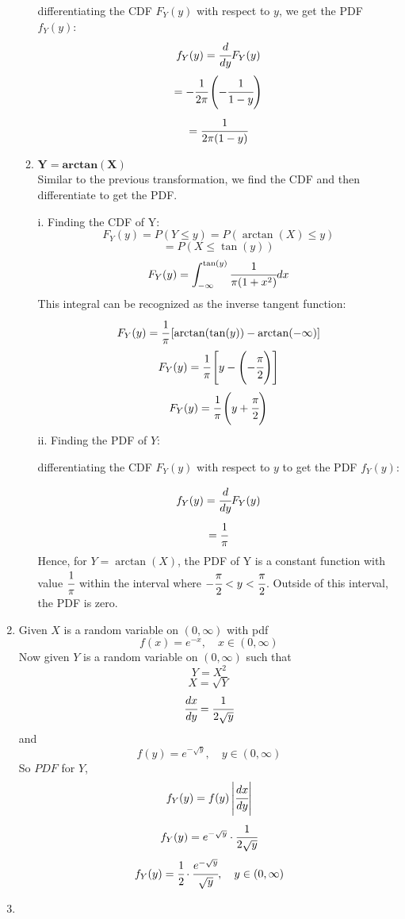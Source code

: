 \documentclass{article}
\begin{document}
\begin{enumerate}
\begin{enumerate}
        differentiating the CDF $F_Y(y)$ with respect to $y$, we get the PDF $f_Y(y)$:
        \[
            f_Y(y) = \cfrac{d}{dy} F_Y(y)
        \]
        \[
            = -\cfrac{1}{2\pi} \left( -\cfrac{1}{1 - y} \right)
        \]
        \[
            = \cfrac{1}{2\pi(1 - y)}
        \]
        \item \( \mathbf{Y = arctan(X)} \)\\
        Similar to the previous transformation, we find the CDF and then differentiate to get the PDF.

        i. Finding the CDF of Y:
        \[ 
            F_Y(y) = P(Y \leq y) = P(\arctan(X) \leq y) 
        \]
        \[ 
            = P(X \leq \tan(y))
        \]
        \[
            F_Y(y) = \int_{-\infty}^{\tan(y)} \cfrac{1}{\pi(1 + x^2)} dx
        \]
        This integral can be recognized as the inverse tangent function:
        \[
            F_Y(y) = \cfrac{1}{\pi} \left[ \arctan(\tan(y)) - \arctan(-\infty) \right]
        \]
        \[
            F_Y(y) = \cfrac{1}{\pi} \left[ y - \left( -\cfrac{\pi}{2} \right) \right]
        \]
        \[
            F_Y(y) = \cfrac{1}{\pi} \left( y + \cfrac{\pi}{2} \right)
        \]
        ii. Finding the PDF of $Y$:

        differentiating the CDF $F_Y(y)$ with respect to $y$ to get the PDF $f_Y(y)$:

        \[
            f_Y(y) = \cfrac{d}{dy} F_Y(y)
        \]
        \[
            = \cfrac{1}{\pi}
        \]
        Hence, for $Y = \arctan(X)$, the PDF of Y is a constant function with value $\cfrac{1}{\pi}$ within the interval where $-\cfrac{\pi}{2} < y < \cfrac{\pi}{2}$. Outside of this interval, the PDF is zero.
        \end{enumerate}

\newpage
\item 
    Given $X$ is a random variable on $(0, \infty)$ with pdf
    \[
        f(x) = e^{-x}, \quad x \in (0, \infty)
    \]
    Now given $Y$ is a random variable on $(0, \infty)$ such that
    \[ 
        Y = X^2
    \]
    \[
        X = \sqrt{Y}
    \]
    \[
        \cfrac{dx}{dy} = \cfrac{1}{2\sqrt{y}}
    \]
    and 
    \[
        f(y) = e^{-\sqrt{y}}, \quad y \in (0, \infty)
    \]
    So \(PDF\) for $Y$,
    \[
        f_Y(y) = f(y) \left|\cfrac{dx}{dy}\right|
    \]
    \[
        f_Y(y) = e^{-\sqrt{y}} \cdot \cfrac{1}{2\sqrt{y}}
    \]
    \[
        f_Y(y) = \cfrac{1}{2} \cdot \cfrac{e^{-\sqrt{y}}}{\sqrt{y}}, \quad y \in (0, \infty)
    \]

\newpage
\item 
        

\end{enumerate}
\end{document}
